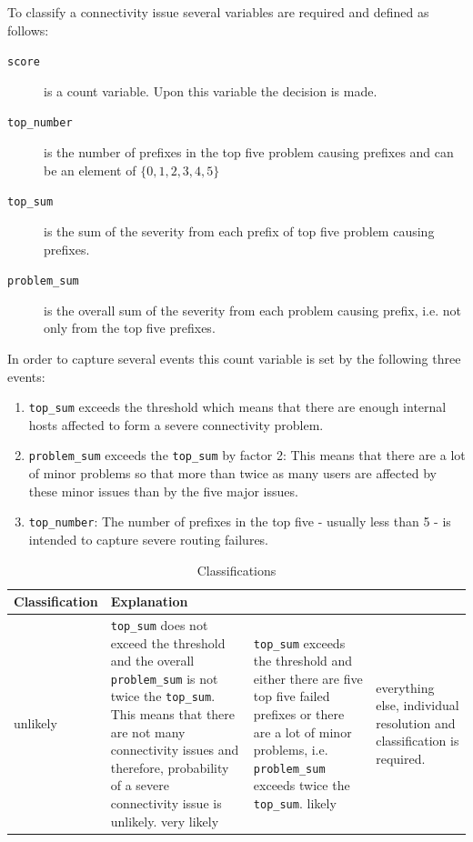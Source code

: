 To classify a connectivity issue several variables are required and defined as follows:
\begin{description}
	\item[\texttt{score}] is a count variable. Upon this variable the decision is made.
	\item[\texttt{top\_number}] is the number of prefixes in the top five problem causing prefixes and can be an element of $\{0,1,2,3,4,5\}$
	\item[\texttt{top\_sum}] is the sum of the severity from each prefix of top five problem causing prefixes.
	\item[\texttt{problem\_sum}] is the overall sum of the severity from each problem causing prefix, i.e. not only from the top five prefixes.
\end{description}
In order to capture several events this count variable is set by the following three events:
\begin{enumerate}
	\item \texttt{top\_sum} exceeds the threshold which means that there are enough internal hosts affected to form a severe connectivity problem.
	\item \texttt{problem\_sum} exceeds the \texttt{top\_sum} by factor 2: This means that there are a lot of minor problems so that more than twice as many users are affected by these minor issues than by the five major issues.
	\item \texttt{top\_number}: The number of prefixes in the top five - usually less than 5 - is intended to capture severe routing failures.
\end{enumerate}

\begin{table}[ht!]
	\begin{center}
		\begin{tabular}{|l|p{12cm}|}
			\hline
			\textbf{Classification} & \textbf{Explanation}\\
			\hline\hline
			unlikely & \texttt{top\_sum} does not exceed the threshold and the overall \texttt{problem\_sum} is not twice the \texttt{top\_sum}. This means that there are not many connectivity issues and therefore, probability of a severe connectivity issue is unlikely.\cr
			\hline
			very likely & \texttt{top\_sum} exceeds the threshold and either there are five top five failed prefixes or there are a lot of minor problems, i.e. \texttt{problem\_sum} exceeds twice the \texttt{top\_sum}. \cr
			\hline
			likely & everything else, individual resolution and classification is required. \\
			\hline
		\end{tabular}

		\caption{Classifications}
		\label{tab:classification}
	\end{center}
\end{table}

